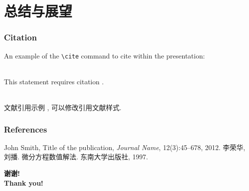 \documentclass[noamsthm,notheorems,11pt,compress]{beamer}
\begin{document}
\section{总结与展望}

\begin{frame}[fragile] %
\frametitle{Citation}
An example of the \verb|\cite| command to cite within the presentation:\\~

This statement requires citation \cite{Smith2012}. \\~

文献引用示例 \cite{LiLiu1997}, 可以修改引用文献样式.
\end{frame}


\begin{frame}
\frametitle{References}
\footnotesize{
\begin{thebibliography}{99} %
 John Smith, Title of the publication, \emph{Journal Name}, 12(3):45--678, 2012.
 李荣华, 刘播. 微分方程数值解法. 东南大学出版社, 1997.
\end{thebibliography}
}
\end{frame}




\begin{frame}
\begin{center}
\Huge\bfseries \textcolor{structure.fg}{谢\quad 谢! \\[8pt]
Thank you!}
\end{center}
\end{frame}


\end{document}
